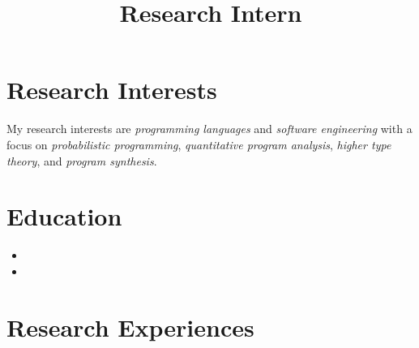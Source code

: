 \documentclass[11pt,letterpaper,sans]{moderncv}        %
\title{Research Intern}                               %
\begin{document}
\makecvtitle


\vspace{-3em}

\section{Research Interests}

My research interests are \emph{programming languages} and \emph{software engineering} with a focus on \emph{probabilistic programming}, \emph{quantitative program analysis}, \emph{higher type theory}, and \emph{program synthesis}.

\section{Education}

\begin{itemize}
	\item{}
	
	\vspace{2pt}
	
	\item{}
\end{itemize}

\section{Research Experiences}
\end{document}
